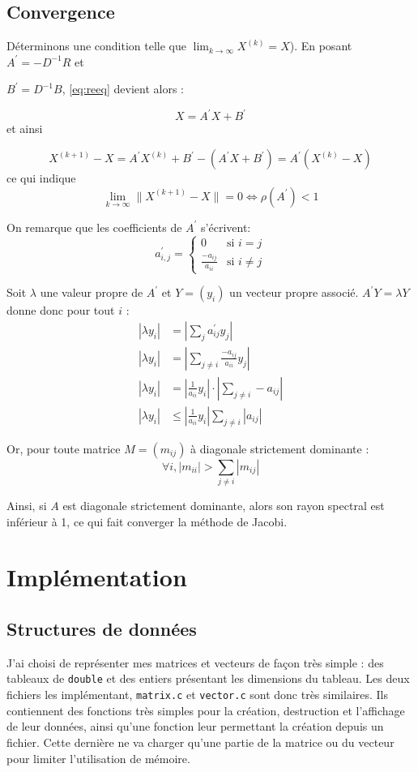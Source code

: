 \documentclass[11pt, a4paper]{article}
\begin{document}
\newpage
\subsection{Convergence}

Déterminons une condition telle que \(\lim_{k \to \infty} X^{(k)} = X\)).
En posant \( A^\prime = -D^{-1}R\) et

\( B^\prime = D^{-1}B \),
\eqref{eq:reeq} devient alors :

\[
    X = A^\prime X + B^\prime
\]
et ainsi

\[
    X^{(k+1)} - X = A^\prime X^{(k)} + B^\prime - (A^\prime X + B^\prime)
    =  A^\prime (X^{(k)} - X)
\]
ce qui indique
\[
    \lim_{k \to \infty} \| X^{(k+1)} - X \| = 0 \Leftrightarrow \rho(A^\prime) < 1
\]

On remarque que les coefficients de \( A^\prime \) s'écrivent:
\[
    a^\prime_{i,j} = \left\{
        \begin{array}{lr}
            0 & \text{si } i = j \\
            \frac{-a_{ij}}{a_{ii}} & \text{si } i \neq j
        \end{array}
    \right.
\]

Soit \( \lambda \) une valeur propre de \( A^\prime \) et \( Y = (y_i) \)
un vecteur propre associé.
\( A^\prime Y = \lambda Y \) donne donc pour tout \(i\) :
\begin{align*}
    |\lambda y_i| &= | \sum_j a^\prime_{ij} y_j | \\
    |\lambda y_i| &= | \sum_{j \neq i} \frac{-a_{ij}}{a_{ii}} y_j | \\
    |\lambda y_i| &= |\frac{1}{a_{ii}} y_i| \cdot | \sum_{j \neq i} -a_{ij}| \\
    |\lambda y_i| &\leq |\frac{1}{a_{ii}} y_i| \sum_{j \neq i} |a_{ij}|
\end{align*}

Or, pour toute matrice \( M = (m_{ij}) \) à diagonale strictement dominante :
\[
    \forall i, |m_{ii}| > \sum_{j \neq i} |m_{ij}|
\]

Ainsi, si \( A \) est diagonale strictement dominante, alors son rayon spectral est inférieur à 1, ce qui fait converger la méthode de Jacobi.

\newpage
\section{Implémentation}
\subsection{Structures de données}
J'ai choisi de représenter mes matrices et vecteurs de façon très simple :
des tableaux de \lstinline{double} et des entiers présentant les dimensions du tableau.
Les deux fichiers les implémentant, \texttt{matrix.c} et \texttt{vector.c} sont donc très similaires.
Ils contiennent des fonctions très simples pour la création, destruction et l'affichage de leur données, ainsi qu'une fonction leur permettant la création depuis un fichier. Cette dernière ne va charger qu'une partie de la matrice ou du vecteur pour limiter l'utilisation de mémoire.
\end{document}
